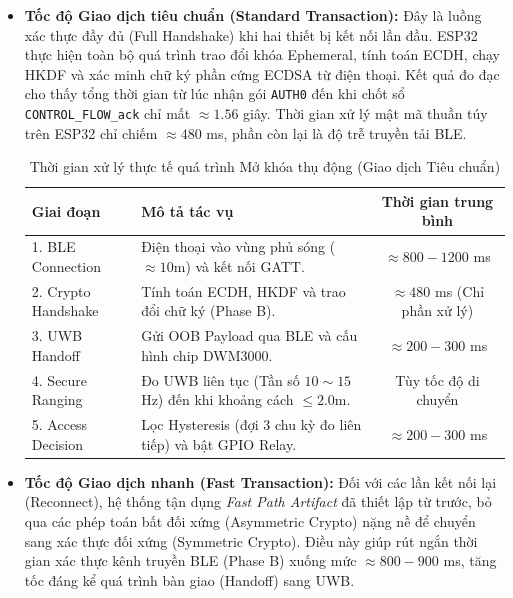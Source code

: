 \begin{itemize}
    \item \textbf{Tốc độ Giao dịch tiêu chuẩn (Standard Transaction):} Đây là luồng xác thực đầy đủ (Full Handshake) khi hai thiết bị kết nối lần đầu. ESP32 thực hiện toàn bộ quá trình trao đổi khóa Ephemeral, tính toán ECDH, chạy HKDF và xác minh chữ ký phần cứng ECDSA từ điện thoại. Kết quả đo đạc cho thấy tổng thời gian từ lúc nhận gói \texttt{AUTH0} đến khi chốt sổ \texttt{CONTROL\_FLOW\_ack} chỉ mất $\approx 1.56$ giây. Thời gian xử lý mật mã thuần túy trên ESP32 chỉ chiếm $\approx 480$ ms, phần còn lại là độ trễ truyền tải BLE.
    \leavevmode
    \begin{table}[!htbp]
        \centering
        \caption{Thời gian xử lý thực tế quá trình Mở khóa thụ động (Giao dịch Tiêu chuẩn)}
        \label{tab:latency_breakdown_real}
        \begin{tabular}{|l|p{6.5cm}|c|}
            \hline
            \textbf{Giai đoạn} & \textbf{Mô tả tác vụ} & \textbf{Thời gian trung bình} \\
            \hline
            1. BLE Connection & Điện thoại vào vùng phủ sóng ($\approx 10$m) và kết nối GATT. & $\approx 800 - 1200$ ms \\
            \hline
            2. Crypto Handshake & Tính toán ECDH, HKDF và trao đổi chữ ký (Phase B). & $\approx 480$ ms (Chỉ phần xử lý) \\
            \hline
            3. UWB Handoff & Gửi OOB Payload qua BLE và cấu hình chip DWM3000. & $\approx 200 - 300$ ms \\
            \hline
            4. Secure Ranging & Đo UWB liên tục (Tần số $10\sim15$ Hz) đến khi khoảng cách $\le 2.0$m. & Tùy tốc độ di chuyển \\
            \hline
            5. Access Decision & Lọc Hysteresis (đợi 3 chu kỳ đo liên tiếp) và bật GPIO Relay. & $\approx 200 - 300$ ms \\
            \hline
        \end{tabular}
    \end{table}
    \item \textbf{Tốc độ Giao dịch nhanh (Fast Transaction):} Đối với các lần kết nối lại (Reconnect), hệ thống tận dụng \textit{Fast Path Artifact} đã thiết lập từ trước, bỏ qua các phép toán bất đối xứng (Asymmetric Crypto) nặng nề để chuyển sang xác thực đối xứng (Symmetric Crypto). Điều này giúp rút ngắn thời gian xác thực kênh truyền BLE (Phase B) xuống mức $\approx 800 - 900$ ms, tăng tốc đáng kể quá trình bàn giao (Handoff) sang UWB.
\end{itemize}



